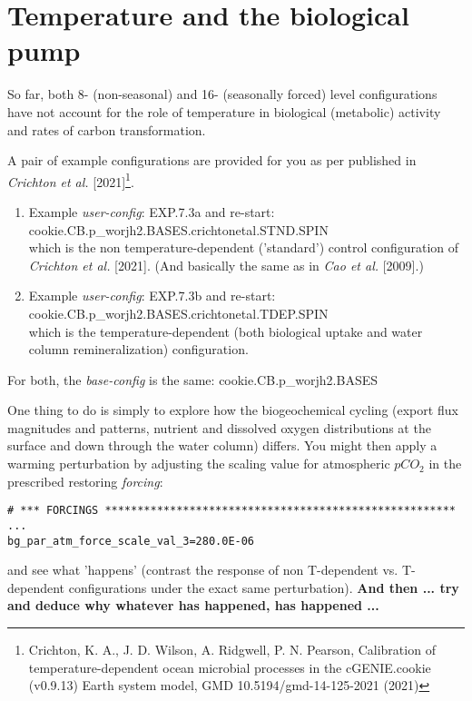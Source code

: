 \section{Temperature and the biological pump}

So far, both 8- (non-seasonal) and 16- (seasonally forced) level configurations have not account for the role of temperature in biological (metabolic) activity and rates of carbon transformation.

\vspace{1mm}
A pair of example configurations are provided for you as per published in \textit{Crichton et al.} [2021]\footnote{Crichton, K. A., J. D. Wilson, A. Ridgwell, P. N. Pearson, Calibration of temperature-dependent ocean microbial processes in the cGENIE.cookie (v0.9.13) Earth system model, GMD 10.5194/gmd-14-125-2021 (2021)}. 

\begin{enumerate}[noitemsep]
\vspace{1mm}
\item Example \textit{user-config}: \textsf{\footnotesize EXP.7.3a} and re-start: \textsf{\footnotesize cookie.CB.p\_worjh2.BASES.crichtonetal.STND.SPIN}
\\which is the non temperature-dependent ('standard') control configuration of \textit{Crichton et al.} [2021]. (And basically the same as in \textit{Cao et al.} [2009].) 
\vspace{1mm}
\item Example \textit{user-config}: \textsf{\footnotesize EXP.7.3b} and re-start: \textsf{\footnotesize cookie.CB.p\_worjh2.BASES.crichtonetal.TDEP.SPIN}
\\which is the temperature-dependent (both biological uptake and water column remineralization) configuration. 
\end{enumerate}

\vspace{1mm}
For both, the \textit{base-config} is the same: \textsf{\footnotesize cookie.CB.p\_worjh2.BASES}

\vspace{1mm}
\noindent One thing to do is simply to explore how the biogeochemical cycling (export flux magnitudes and patterns, nutrient and dissolved oxygen distributions at the surface and down through the water column) differs. You might then apply a warming perturbation by adjusting the scaling value for atmospheric \(pCO_{2}\) in the prescribed restoring \textit{forcing}:

\vspace{-2mm}\small\begin{verbatim}
# *** FORCINGS ******************************************************
...
bg_par_atm_force_scale_val_3=280.0E-06
\end{verbatim}\normalsize\vspace{-2mm}
and see what 'happens' (contrast the response of non T-dependent vs. T-dependent configurations under the exact same perturbation). \textbf{And then ... try and deduce why whatever has happened, has happened ...}

